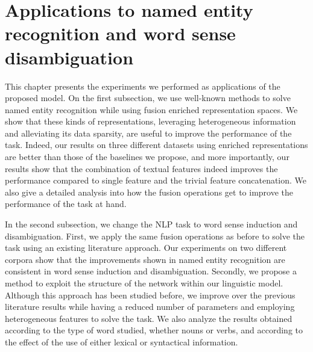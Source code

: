 \chapter{Applications to named entity recognition and word sense disambiguation} 
\label{chap:wsd}
\begin{abstractchap}
This chapter presents the experiments we performed as applications of the proposed model. On the first subsection, we use well-known methods to solve named entity recognition while using fusion enriched representation spaces. We show that these kinds of representations, leveraging heterogeneous information and alleviating its data sparsity, are useful to improve the performance of the task. Indeed, our results on three different datasets using enriched representations are better than those of the baselines we propose, and more importantly, our results show that the combination of textual features indeed improves the performance compared to single feature and the trivial feature concatenation. We also give a detailed analysis into how the fusion operations get to improve the performance of the task at hand.

In the second subsection, we change the NLP task to word sense induction and disambiguation. First, we apply the same fusion operations as before to solve the task using an existing literature approach. Our experiments on two different corpora show that the improvements shown in named entity recognition are consistent in word sense induction and disambiguation. Secondly, we propose a method to exploit the structure of the network within our linguistic model. 
Although this approach has been studied before, we improve over the previous  literature results while having a reduced number of parameters and employing heterogeneous features to solve the task. We also analyze the results obtained according to the  type of word studied, whether nouns or verbs, and according to the effect of the use of either lexical or syntactical information.



\end{abstractchap}

